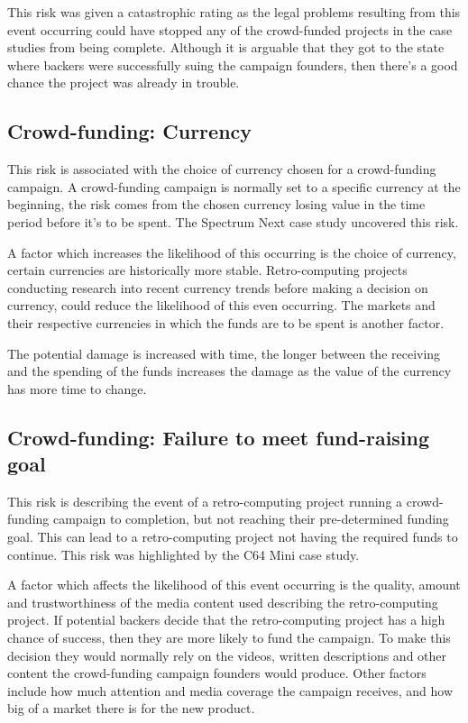 This risk was given a catastrophic rating as the legal problems resulting from this event occurring could have stopped any of the crowd-funded projects in the case studies from being complete. Although it is arguable that they got to the state where backers were successfully suing the campaign founders, then there's a good chance the project was already in trouble.\\


\subsection{Crowd-funding: Currency}
This risk is associated with the choice of currency chosen for a crowd-funding campaign. A crowd-funding campaign is normally set to a specific currency at the beginning, the risk comes from the chosen currency losing value in the time period before it's to be spent. The Spectrum Next case study uncovered this risk. 

A factor which increases the likelihood of this occurring is the choice of currency, certain currencies are historically more stable. Retro-computing projects conducting research into recent currency trends before making a decision on currency, could reduce the likelihood of this even occurring. The markets and their respective currencies in which the funds are to be spent is another factor.

The potential damage is increased with time, the longer between the receiving and the spending of the funds increases the damage as the value of the currency has more time to change. 


\subsection{Crowd-funding: Failure to meet fund-raising goal}
This risk is describing the event of a retro-computing project running a crowd-funding campaign to completion, but not reaching their pre-determined funding goal. This can lead to a retro-computing project not having the required funds to continue. This risk was highlighted by the C64 Mini case study.

A factor which affects the likelihood of this event occurring is the quality, amount and trustworthiness of the media content used describing the retro-computing project. If potential backers decide that the retro-computing project has a high chance of success, then they are more likely to fund the campaign. To make this decision they would normally rely on the videos, written descriptions and other content the crowd-funding campaign founders would produce. Other factors include how much attention and media coverage the campaign receives, and how big of a market there is for the new product. 

